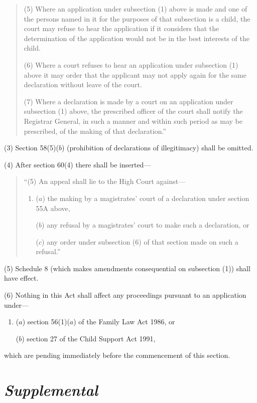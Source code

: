 \documentclass[12pt,a4paper]{article}
\begin{document}
\begin{quotation}
(5) Where an application under subsection (1)  above is made and one of the persons named in it for the purposes of that subsection is a child, the court may refuse to hear the application if it considers that the determination of the application would not be in the best interests of the child.

(6) Where a court refuses to hear an application under subsection (1)  above it may order that the applicant may not apply again for the same declaration without leave of the court.

(7) Where a declaration is made by a court on an application under subsection (1)  above, the prescribed officer of the court shall notify the Registrar General, in such a manner and within such period as may be prescribed, of the making of that declaration.”
\end{quotation}

(3) Section 58(5)($b$)  (prohibition of declarations of illegitimacy) shall be omitted.

(4) After section 60(4)  there shall be inserted—
\begin{quotation}
“(5) An appeal shall lie to the High Court against—
\begin{enumerate}\item[]
($a$) the making by a magistrates' court of a declaration under section 55A above,

($b$) any refusal by a magistrates' court to make such a declaration, or

($c$) any order under subsection (6)  of that section made on such a refusal.”
\end{enumerate}
\end{quotation}

(5) Schedule 8 (which makes amendments consequential on subsection (1)) shall have effect.

(6) Nothing in this Act shall affect any proceedings pursuant to an application under—
\begin{enumerate}\item[]
($a$) section 56(1)($a$)  of the Family Law Act 1986, or

($b$) section 27 of the Child Support Act 1991,
\end{enumerate}
which are pending immediately before the commencement of this section.

\section{\itshape Supplemental}
\end{document}
